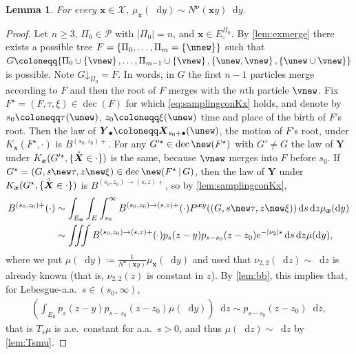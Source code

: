 \documentclass[reqno,draft]{amsart}
\numberwithin{equation}{section}
\theoremstyle{plain}
\newtheorem{lemma}[theorem]{Lemma}
\theoremstyle{remark}
\newcommand*\diff{\mathop{}\!\mathrm{d}}
\newcommand{\e}{\mathrm{e}}
\newcommand{\fpart}{\Pi} %
\DeclareMathOperator{\dcb}{dec}
\newcommand{\nut}[1]{|\nu_{#1}|}
\newcommand{\rs}[1]{\accentset{\circ}{#1}} %
\newcommand{\rsto}[1]{\mathord\downarrow_{#1}}
\begin{document}
\begin{lemma}\label{lem:mux}
    For every $\boldsymbol x\in \mathcal{X}$, $\mu_{\boldsymbol x}(\diff y) \sim N^{\boldsymbol\nu}(\boldsymbol x y) \diff y$.
\end{lemma}
\begin{proof}
    Let $n\ge 3$, $\fpart_0\in \mathcal{P}$ with $|\fpart_0| = n$, and $\boldsymbol x\in E^{\fpart_0}_\circ $. By \cref{lem:exmerge} there exists a possible tree $F = \{\fpart_0, \ldots ,\fpart_m = \left\{ \unew \right\} \}$ such that $G \coloneqq \{\fpart_0\cup\left\{ \vnew \right\} , \ldots ,\fpart_{m-1} \cup \left\{ \vnew \right\}, \left\{ \unew,\vnew \right\} , \left\{ \unew \cup \vnew \right\} \}$ is possible. Note $G\rsto{\fpart_0} = F$. In words, in $G$ the first $n-1$ particles merge according to $F$ and then the root of $F$ merges with the $n$th particle $\vnew$. Fix $F^\star=(F,\tau,\xi)\in \dcb(F)$ for which \cref{eq:samplingconKx} holds, and denote by $s_0\coloneqq \tau(\unew)$, $z_0\coloneqq \xi(\unew)$ time and place of the birth of $F$'s root. Then the law of $\boldsymbol Y_{\bullet} \coloneqq \boldsymbol X_{s_0+\bullet}(\unew)$, the motion of $F$'s root, under $K_{\boldsymbol x}(F^\star,\cdot )$ is $B^{(s_0,z_0)+}$. For any $G'^\star \in \dcb\new(F^\star)$ with $G'\neq G$ the law of $\boldsymbol Y$ under $K_{\boldsymbol x}(G'^\star,\{\rs{\boldsymbol X}\in\cdot \})$ is the same, because $\vnew$ merges into $F$ before $s_0$. If $G^\star = (G,s\new\tau,z\new\xi) \in \dcb\new(F^\star \,\vert\,G)$, then the law of $\boldsymbol Y$ under $K_{\boldsymbol x}(G^\star,\{\rs{\boldsymbol X}\in\cdot \})$ is $B^{(s_0,z_0)\to(s,z)+}$, so by \cref{lem:samplingconKx},
    \begin{align*}
        B^{(s_0,z_0)+}(\cdot )
        &\sim \int_{E_{\boldsymbol x}} \int_E \int_{s_0}^\infty B^{(s_0,z_0)\to(s,z)+}(\cdot ) P^{\boldsymbol x y}((G,s\new\tau,z\new\xi)) \diff s\diff z\mu_{\boldsymbol x}(\diff y)\\
        &\sim \iiint B^{(s_0,z_0)\to(s,z)+}(\cdot ) p_s(z-y) p_{s-s_0}(z-z_0) \e^{-\nut{2} s} \diff s\diff z \mu(\diff y),
    \end{align*}
    where we put $\mu(\diff y) \coloneqq \frac{1}{N^{\boldsymbol\nu}(\boldsymbol x y)}\mu_{\boldsymbol x}(\diff y)$ and used that $\nu_{2,2}(\diff z) \sim \diff z$ is already known (that is, $\nu_{2,2}(z)$ is constant in $z$). By \cref{lem:bb}, this implies that, for Lebesgue-a.a.\ $s \in (s_0,\infty)$,
    \begin{align*}
        \left(\int_{E_{\boldsymbol x}} p_s(z-y) p_{s-s_0}(z-z_0) \mu(\diff y) \right) \diff z\sim p_{s-s_0}(z-z_0) \diff z,
    \end{align*}
    that is $T_s \mu$ is a.e.\ constant for a.a.\ $s>0$, and thus $\mu(\diff z) \sim \diff z$ by \cref{lem:Tsmu}.
\end{proof}
\end{document}
